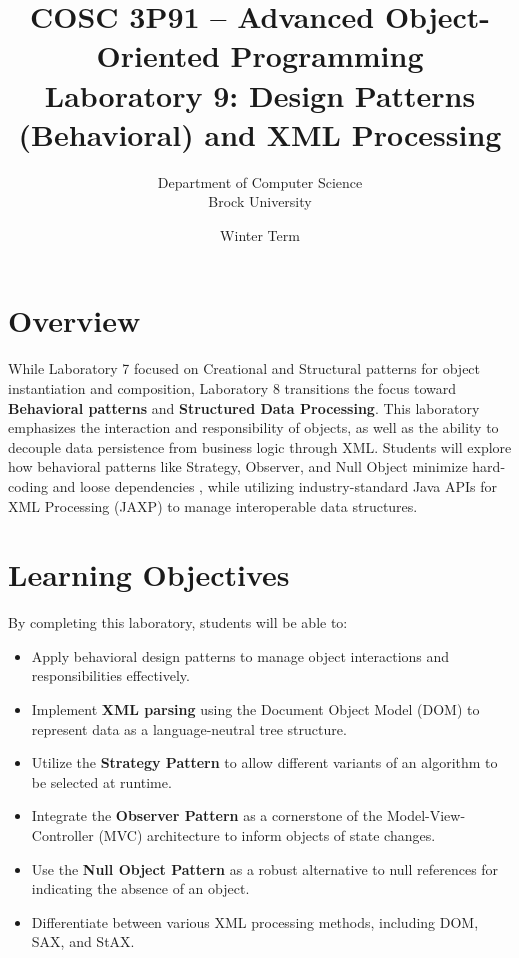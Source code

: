 \documentclass[11pt]{article}
\title{COSC 3P91 -- Advanced Object-Oriented Programming\\
Laboratory 9: Design Patterns (Behavioral) and XML Processing}
\author{Department of Computer Science \\ Brock University}
\date{Winter Term}
\begin{document}
\maketitle

\section*{Overview}
While Laboratory 7 focused on Creational and Structural patterns for object instantiation and composition, Laboratory 8 transitions the focus toward \textbf{Behavioral patterns} and \textbf{Structured Data Processing}. This laboratory emphasizes the interaction and responsibility of objects, as well as the ability to decouple data persistence from business logic through XML. Students will explore how behavioral patterns like Strategy, Observer, and Null Object minimize hard-coding and loose dependencies , while utilizing industry-standard Java APIs for XML Processing (JAXP) to manage interoperable data structures.

\section*{Learning Objectives}
By completing this laboratory, students will be able to:
\begin{itemize}
    \item Apply behavioral design patterns to manage object interactions and responsibilities effectively.
    \item Implement \textbf{XML parsing} using the Document Object Model (DOM) to represent data as a language-neutral tree structure.
    \item Utilize the \textbf{Strategy Pattern} to allow different variants of an algorithm to be selected at runtime.
    \item Integrate the \textbf{Observer Pattern} as a cornerstone of the Model-View-Controller (MVC) architecture to inform objects of state changes.
    \item Use the \textbf{Null Object Pattern} as a robust alternative to null references for indicating the absence of an object.
    \item Differentiate between various XML processing methods, including DOM, SAX, and StAX.
\end{itemize}

\end{document}
